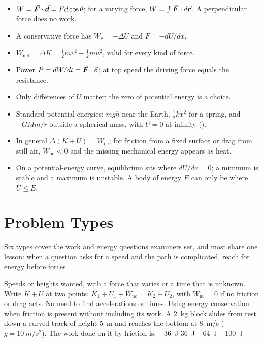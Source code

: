 \begin{itemize}
\item $W=\vec{\bm{F}}\cdot\vec{\bm{d}}=Fd\cos\theta$; for a varying force, $W=\int\vec{\bm{F}}\cdot d\vec{\bm{r}}$. A perpendicular force
      does no work.
\item A conservative force has $W_c=-\Delta U$ and $F=-dU/dx$.
\item $W_{\text{net}}=\Delta K=\tfrac12mv^2-\tfrac12mu^2$, valid for every kind of force.
\item Power $P=dW/dt=\vec{\bm{F}}\cdot\vec{\bm{v}}$; at top speed the driving force equals the resistance.
\item Only differences of $U$ matter; the zero of potential energy is a choice.
\item Standard potential energies: $mgh$ near the Earth, $\tfrac12kx^2$ for a spring, and $-GMm/r$ outside a spherical
      mass, with $U=0$ at infinity ().
\item In general $\Delta(K+U)=W_{\text{nc}}$; for friction from a fixed surface or drag from still air,
      $W_{\text{nc}}<0$ and the missing mechanical energy appears as heat.
\item On a potential-energy curve, equilibrium sits where $dU/dx=0$; a minimum is stable and a maximum is
      unstable. A body of energy $E$ can only be where $U\le E$.
\end{itemize}

\section{Problem Types}\label{sec:types11}
Six types cover the work and energy questions examiners set, and most share one lesson: when a question
asks for a speed and the path is complicated, reach for energy before forces.

{Speeds or heights wanted, with a force that varies or a time that is unknown.}
{Write $K+U$ at two points: $K_1+U_1+W_{\text{nc}}=K_2+U_2$, with $W_{\text{nc}}=0$ if no friction or drag acts. No
need to find accelerations or times.}
{Using energy conservation when friction is present without including its work.}
{A \SI{2}{kg} block slides from rest down a curved track of height \SI{5}{m} and reaches the bottom at
\SI{8}{m/s} ($g=\SI{10}{m/s^2}$). The work done on it by friction is:}
{\SI{-36}{J}}
{\SI{+36}{J}}
{\SI{-64}{J}}
{\SI{-100}{J}}

